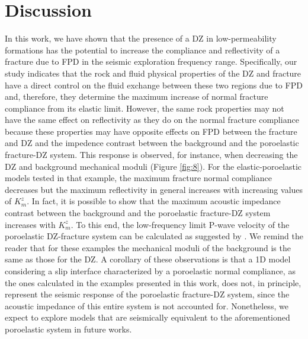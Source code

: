 \documentclass[draft]{agujournal2019}
\begin{document}
\section{Discussion}
In this work, we have shown that the presence of a DZ in low-permeability formations has the potential to increase the compliance and reflectivity of a fracture due to FPD in the seismic exploration frequency range. Specifically, our study indicates that the rock and fluid  physical properties of the DZ and fracture  have a direct control on the fluid exchange between these two regions due to FPD and, therefore, they determine the maximum increase of normal fracture compliance from its elastic limit.
However, the same rock properties may not have the same effect on reflectivity as they do on the normal fracture compliance because these properties may have opposite effects on FPD between the fracture and DZ and the impedence contrast between the background and the poroelastic fracture-DZ system.
This response is observed, for instance, when decreasing the DZ and background mechanical moduli (Figure \ref{fig:8}). 
For the elastic-poroelastic models tested in that example, the maximum fracture normal compliance decreases but the maximum reflectivity in general increases with increasing values of $K_m^z$. In fact, it is possible to show that the maximum acoustic impedance contrast between the  background and the poroelastic fracture-DZ system increases with $K_m^z$. To this end,  the low-frequency limit P-wave velocity of the  poroelastic DZ-fracture system can be calculated as suggested by . We remind the reader that for these examples the mechanical moduli of the background is the same as those for the DZ. A corollary of these observations is that a 1D model considering a slip interface characterized by a poroelastic normal compliance, as the ones calculated in the examples presented in this work, does not, in principle, 
represent the seismic response of the poroelastic fracture-DZ system, since the acoustic impedance of this entire system is not accounted for. Nonetheless, we expect to explore models that are seismically equivalent to the aforementioned poroelastic system in future works.
\end{document}

